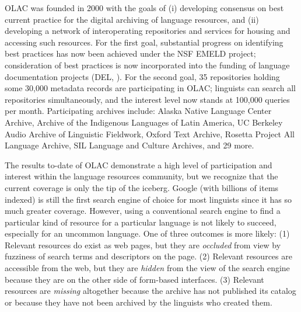 
OLAC was founded in 2000 with the goals of (i) developing consensus on
best current practice for the digital archiving of language resources,
and (ii) developing a network of interoperating repositories and
services for housing and accessing such resources.  For the first
goal, substantial progress on identifying best practices has now been
achieved under the NSF EMELD project; consideration of best practices
is now incorporated into the funding of language documentation
projects (DEL, \citet{BirdSimons03language}).  For the second goal,
35 repositories holding some 30,000 metadata records are
participating in OLAC; linguists can search all repositories
simultaneously, and the interest level now stands
at 100,000 queries per month.  Participating archives include:
Alaska Native Language Center Archive,
Archive of the Indigenous Languages of Latin America,
UC Berkeley Audio Archive of Linguistic Fieldwork,
Oxford Text Archive, Rosetta Project All Language Archive, 
SIL Language and Culture Archives, and 29 more.



The results to-date of OLAC demonstrate a high level of participation
and interest within the language resources community, but we recognize
that the current coverage is only the 
tip of the iceberg. Google (with billions of items indexed) is still
the first search engine of choice for most linguists since it has so
much greater coverage. However, using a conventional search engine to
find a particular kind of resource for a particular language is
not likely to succeed, especially for an uncommon language. 
One of three outcomes is more likely:
(1) Relevant resources do exist as web pages, but they are 
{\it occluded} from view by fuzziness of search terms and 
descriptors on the page.
(2) Relevant resources are accessible from the web, but they are
{\it hidden} from the view of the search engine because they are
on the other side of form-based interfaces.
(3) Relevant resources are {\it missing} altogether because the
archive has not published its catalog or because they have not
been archived by the linguists who created them.

